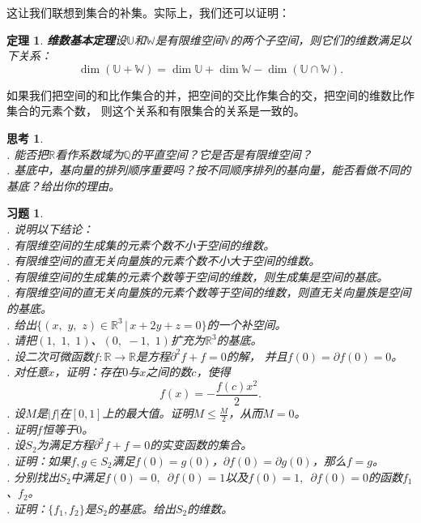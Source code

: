 \documentclass[12pt,UTF8]{ctexbook}
\newtheorem{tm}{定理}[section]
\newtheorem{sk}{思考}[section]
\newtheorem{xt}{习题}[section]
\begin{document}
这让我们联想到集合的补集。实际上，我们还可以证明：

\begin{tm}{\textbf{维数基本定理}}\label{tm:4-3-80}
    设$\mathbb{U}$和$\mathbb{W}$是有限维空间$\mathbb{V}$的两个子空间，则它们的维数满足以下关系：
    $$ \dim (\mathbb{U} + \mathbb{W}) = \dim \mathbb{U} + \dim \mathbb{W} - \dim (\mathbb{U} \cap \mathbb{W}).$$
\end{tm}
如果我们把空间的和比作集合的并，把空间的交比作集合的交，把空间的维数比作集合的元素个数，
则这个关系和有限集合的关系是一致的。

\begin{sk}
    \mbox{} \\
    . 能否把$\mathbb{R}$看作系数域为$\mathbb{Q}$的平直空间？它是否是有限维空间？\\
    . 基底中，基向量的排列顺序重要吗？按不同顺序排列的基向量，能否看做不同的基底？给出你的理由。
\end{sk}

\begin{xt}
    \mbox{} \\
    . 说明以下结论：\\
    . 有限维空间的生成集的元素个数不小于空间的维数。\\
    . 有限维空间的直无关向量族的元素个数不小大于空间的维数。\\
    . 有限维空间的生成集的元素个数等于空间的维数，则生成集是空间的基底。\\
    . 有限维空间的直无关向量族的元素个数等于空间的维数，则直无关向量族是空间的基底。\\
    . 给出$\{(x,\,\,y,\,\,z)\in\mathbb{R}^3 \, | \, x + 2y + z = 0 \}$的一个补空间。\\
    . 请把$(1,\,\,1, \,\,1)$、$(0,\,\, -1, \,\,1)$扩充为$\mathbb{R}^3$的基底。\\
    . 设二次可微函数$f:\mathbb{R} \rightarrow \mathbb{R}$是方程$\partial^2 f + f = 0$的解，
    并且$f(0) = \partial f(0) = 0$。\\
    . 对任意$x$，证明：存在$0$与$x$之间的数$c$，使得
    $$ f(x) = -\frac{f(c)x^2}{2}. $$
    . 设$M$是$|f|$在$[0,1]$上的最大值。证明$M \leqslant \frac{M}{2}$，从而$M = 0$。\\
    . 证明$f$恒等于$0$。\\
    . 设$S_2$为满足方程$\partial^2 f + f = 0$的实变函数的集合。\\
    . 证明：如果$f,g\in S_2$满足$f(0) = g(0)$，$\partial f(0) = \partial g(0)$，那么$f = g$。\\
    . 分别找出$S_2$中满足$f(0) = 0, \,\,\, \partial f(0) = 1$以及$f(0) = 1, \,\,\, \partial f(0) = 0$的函数$f_1$、$f_2$。\\
    . 证明：$\{f_1, f_2\}$是$S_2$的基底。给出$S_2$的维数。
\end{xt}
\end{document}
